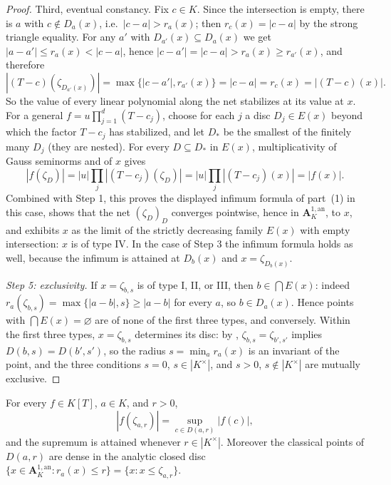\begin{proof}
Third, eventual constancy.  Fix $c\in K$.  Since the intersection is
empty, there is $a$ with $c\notin D_a(x)$, i.e.\
$|c-a|>r_a(x)$; then $r_c(x)=|c-a|$ by the strong triangle
equality.  For any $a'$ with $D_{a'}(x)\subseteq D_a(x)$ we get
$|a-a'|\leq r_a(x)<|c-a|$, hence $|c-a'|=|c-a|>r_a(x)\ge
r_{a'}(x)$, and therefore
\[
 |(T-c)(\zeta_{D_{a'}(x)})|
 =\max\{|c-a'|,r_{a'}(x)\}
 =|c-a|
 =r_c(x)
 =|(T-c)(x)|.
\]
So the value of every linear polynomial along the net stabilizes at its
value at $x$.  For a general
$f=u\prod_{j=1}^d(T-c_j)$, choose for each $j$ a disc
$D_j\in E(x)$ beyond which the factor $T-c_j$ has stabilized, and
let $D_*$ be the smallest of the finitely many $D_j$ (they are
nested).  For every $D\subseteq D_*$ in $E(x)$, multiplicativity of
Gauss seminorms and of $x$ gives
\[
 |f(\zeta_D)|=|u|\prod_j|(T-c_j)(\zeta_D)|
            =|u|\prod_j|(T-c_j)(x)|=|f(x)|.
\]
Combined with Step 1, this proves the displayed infimum formula of
part~(1) in this case, shows that the net
$(\zeta_D)_D$ converges pointwise, hence in
$\mathbf A^{1,\mathrm{an}}_K$, to $x$, and exhibits $x$ as the
limit of the strictly decreasing family $E(x)$ with empty
intersection: $x$ is of type IV.  In the case of Step 3 the infimum
formula holds as well, because the infimum is attained at
$D_b(x)$ and $x=\zeta_{D_b(x)}$.

\emph{Step 5: exclusivity.}
If $x=\zeta_{b,s}$ is of type I, II, or III, then
$b\in\bigcap E(x)$: indeed
$r_a(\zeta_{b,s})=\max\{|a-b|,s\}\geq|a-b|$ for every $a$, so
$b\in D_a(x)$.  Hence points with $\bigcap E(x)=\varnothing$ are of
none of the first three types, and conversely.  Within the first three
types, $x=\zeta_{b,s}$ determines its disc: by
, $\zeta_{b,s}=\zeta_{b',s'}$
implies $D(b,s)=D(b',s')$, so the radius $s=\min_ar_a(x)$ is an
invariant of the point, and the three conditions $s=0$,
$s\in|K^\times|$, and $s>0$, $s\notin|K^\times|$ are mutually
exclusive.
\end{proof}

\begin{corollary}
\label{cor:berk-gauss-sup}
For every $f\in K[T]$, $a\in K$, and $r>0$,
\[
 |f(\zeta_{a,r})|=\sup_{c\in D(a,r)}|f(c)|,
\]
and the supremum is attained whenever $r\in|K^\times|$.  Moreover the
classical points of $D(a,r)$ are dense in the analytic closed disc
$\{x\in\mathbf A^{1,\mathrm{an}}_K:r_a(x)\leq r\}
=\{x:x\leq\zeta_{a,r}\}$.
\end{corollary}

